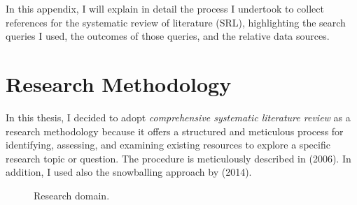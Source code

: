 In this appendix, I will explain in detail the process I undertook to collect references for the systematic review of literature (SRL), highlighting the search queries I used, the outcomes of those queries, and the relative data sources. 

\section{Research Methodology}
\label{sec:resmetodologies}
In this thesis, I decided to adopt \emph{comprehensive systematic literature review} as a research methodology because it offers a structured and meticulous process for identifying, assessing, and examining existing resources to explore a specific research topic or question. The procedure is meticulously described in \citeauthor{budgen_performing_2006} (2006). In addition, I used also the snowballing approach by \citeauthor{wohlin_guidelines_2014} (2014).
\begin{figure}
\begin{center}
\end{center}
\caption{Research domain.} \label{fig:resdomains}
\end{figure}

